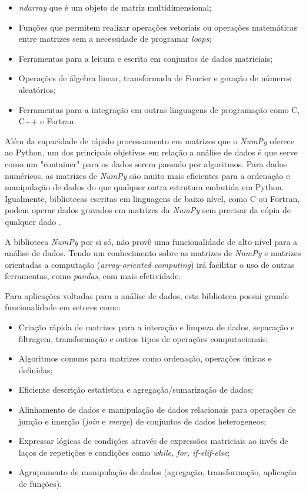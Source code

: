 \begin{itemize}
    \item \textit{ndarray} que é um objeto de matriz multidimensional;
    \item Funções que permitem realizar operações vetoriais ou operações matemáticas entre matrizes sem a necessidade de programar \textit{loops};
    \item Ferramentas para a leitura e escrita em conjuntos de dados matriciais;
    \item Operações de álgebra linear, transformada de Fourier e geração de números aleatórios;
    \item Ferramentas para a integração em outras linguagens de programação como C, C++ e Fortran.
\end{itemize}

Além da capacidade de rápido processamento em matrizes que o \textit{NumPy} oferece ao Python, um dos principais objetivos em relação a análise de dados é que serve como um "container" para os dados serem passado por algoritmos. Para dados numéricos, as matrizes de \textit{NumPy} são muito mais eficientes para a ordenação e manipulação de dados do que qualquer outra estrutura embutida em Python. Igualmente, bibliotecas escritas em linguagens de baixo nível, como C ou Fortran, podem operar dados gravados em matrizes da \textit{NumPy} sem precisar da cópia de qualquer dado \cite{python-analysis}.

A biblioteca \textit{NumPy} por si só, não provê uma funcionalidade de alto-nível para a análise de dados. Tendo um conhecimento sobre as matrizes de \textit{NumPy} e matrizes orientadas a computação (\textit{array-oriented computing}) irá facilitar o uso de outras ferramentas, como \textit{pandas}, com mais efetividade.

Para aplicações voltadas para a análise de dados, esta biblioteca possui grande funcionalidade em setores como:

\begin{itemize}
    \item Criação rápida de matrizes para a interação e limpeza de dados, separação e filtragem, transformação e outros tipos de operações computacionais;
    \item Algoritmos comuns para matrizes como ordenação, operações únicas e definidas;
    \item Eficiente descrição estatística e agregação/sumarização de dados;
    \item Alinhamento de dados e manipulação de dados relacionais para operações de junção e imerção (\textit{join} e \textit{merge}) de conjuntos de dados heterogeneos;
    \item Expressar lógicas de condições através de expressões matriciais ao invés de laços de repetições e condições como \textit{while, for, if-elif-else};
    \item Agrupamento de manipulação de dados (agregação, transformação, aplicação de funções).
\end{itemize}

